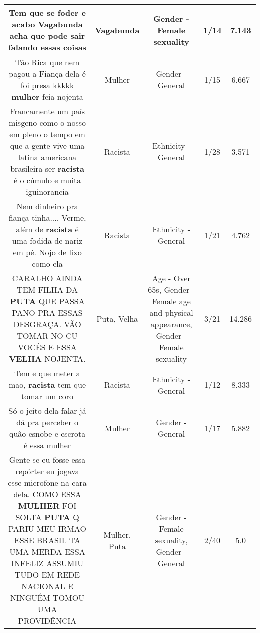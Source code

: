 \documentclass[11pt]{article}
\newlength\mylength
\begin{document}
\begin{center}
\begin{longtable}{|C{.65\mylength}|C{.30\mylength}|C{.12\mylength}|C{.12\mylength}|C{.12\mylength}|}
  \small Tem que se foder e acabo \textbf{Vagabunda} acha que pode sair falando essas coisas\normalsize   & Vagabunda & Gender - Female sexuality & 1/14 & 7.143 \\  \hline
  \small Tão Rica que nem pagou a Fiança dela é foi presa kkkkk \textbf{mulher} feia nojenta\normalsize   & Mulher & Gender - General & 1/15 & 6.667 \\  \hline
  \small Francamente um país misgeno como o nosso em pleno o tempo em que a gente vive uma latina americana brasileira ser \textbf{racista} é o cúmulo e muita iguinorancia\normalsize   & Racista & Ethnicity - General & 1/28 & 3.571 \\  \hline
  \small Nem dinheiro pra fiança tinha.... Verme, além de \textbf{racista} é uma fodida de nariz em pé. Nojo de lixo como ela\normalsize   & Racista & Ethnicity - General & 1/21 & 4.762 \\  \hline
  \small CARALHO AINDA TEM FILHA DA \textbf{PUTA} QUE PASSA PANO PRA ESSAS DESGRAÇA. VÃO TOMAR NO CU VOCÊS E ESSA \textbf{V\textbf{ELHA}} NOJENTA.\normalsize   & Puta, Velha & Age - Over 65s, Gender - Female age and physical appearance, Gender - Female sexuality & 3/21 & 14.286 \\  \hline
  \small Tem e que meter a mao, \textbf{racista} tem que tomar um coro\normalsize   & Racista & Ethnicity - General & 1/12 & 8.333 \\  \hline
  \small Só o jeito dela falar já dá pra perceber o quão esnobe e escrota é essa mulher\normalsize   & Mulher & Gender - General & 1/17 & 5.882 \\  \hline
  \small Gente se eu fosse essa repórter eu jogava esse microfone na cara dela. COMO ESSA \textbf{MULHER} FOI SOLTA \textbf{PUTA} Q PARIU MEU IRMAO ESSE BRASIL TA UMA MERDA ESSA INFELIZ  ASSUMIU TUDO EM REDE NACIONAL E NINGUÉM TOMOU UMA PROVIDÊNCIA\normalsize   & Mulher, Puta & Gender - Female sexuality, Gender - General & 2/40 & 5.0 \\  \hline

\end{longtable}
\end{center}
\end{document}
